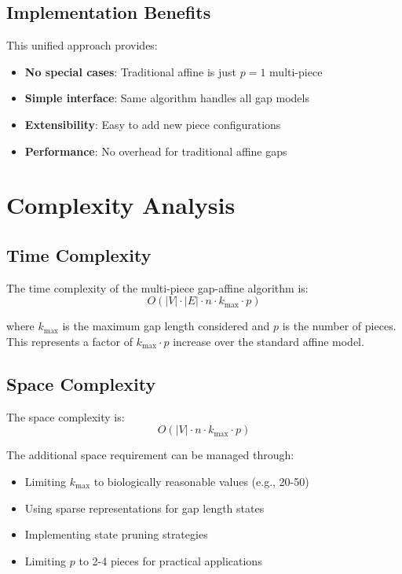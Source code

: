 \documentclass[11pt]{article}
\begin{document}
\subsection{Implementation Benefits}

This unified approach provides:
\begin{itemize}
\item \textbf{No special cases}: Traditional affine is just $p=1$ multi-piece
\item \textbf{Simple interface}: Same algorithm handles all gap models
\item \textbf{Extensibility}: Easy to add new piece configurations
\item \textbf{Performance}: No overhead for traditional affine gaps
\end{itemize}

\section{Complexity Analysis}

\subsection{Time Complexity}

The time complexity of the multi-piece gap-affine algorithm is:
\begin{equation}
O(|V| \cdot |E| \cdot n \cdot k_{\max} \cdot p)
\end{equation}

where $k_{\max}$ is the maximum gap length considered and $p$ is the number of pieces. This represents a factor of $k_{\max} \cdot p$ increase over the standard affine model.

\subsection{Space Complexity}

The space complexity is:
\begin{equation}
O(|V| \cdot n \cdot k_{\max} \cdot p)
\end{equation}

The additional space requirement can be managed through:
\begin{itemize}
\item Limiting $k_{\max}$ to biologically reasonable values (e.g., 20-50)
\item Using sparse representations for gap length states
\item Implementing state pruning strategies
\item Limiting $p$ to 2-4 pieces for practical applications
\end{itemize}
\end{document}
